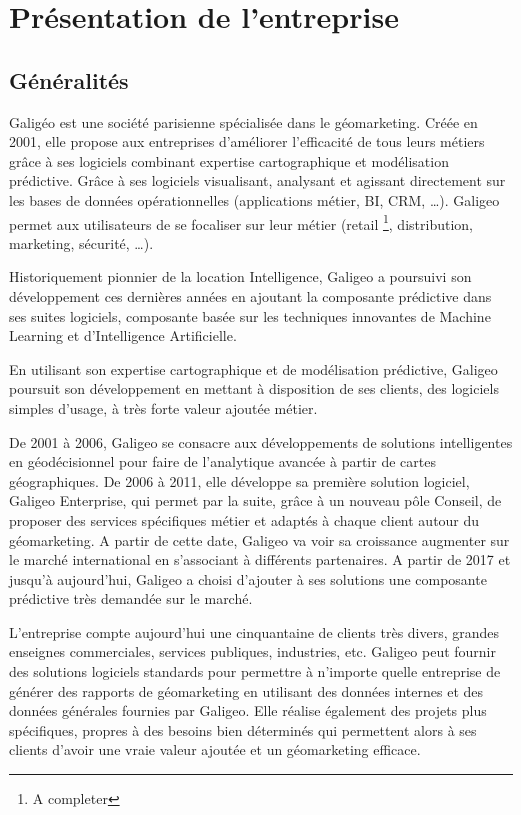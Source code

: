 
\section{Présentation de l'entreprise}

\subsection{Généralités}

Galigéo est une société parisienne spécialisée dans le géomarketing. Créée en 2001, elle propose aux entreprises d’améliorer l’efficacité de tous leurs métiers grâce à ses logiciels combinant expertise cartographique et modélisation prédictive. Grâce à ses logiciels visualisant, analysant et agissant directement sur les bases de données opérationnelles (applications métier, BI, CRM, …). Galigeo permet aux utilisateurs de se focaliser sur leur métier (retail \footnote{A completer}, distribution, marketing, sécurité, …).

Historiquement pionnier de la location Intelligence, Galigeo a poursuivi son développement ces dernières années en ajoutant la composante prédictive dans ses suites logiciels, composante basée sur les techniques innovantes de Machine Learning et d’Intelligence Artificielle.

En utilisant son expertise cartographique et de modélisation prédictive, Galigeo poursuit son développement en mettant à disposition de ses clients, des logiciels simples d’usage, à très forte valeur ajoutée métier.

De 2001 à 2006, Galigeo se consacre aux développements de solutions intelligentes en géodécisionnel pour faire de l'analytique avancée à partir de cartes géographiques. De 2006 à 2011, elle développe sa première solution logiciel, Galigeo Enterprise, qui permet par la suite, grâce à un nouveau pôle Conseil, de proposer des services spécifiques métier et adaptés à chaque client autour du géomarketing. A partir de cette date, Galigeo va voir sa croissance augmenter sur le marché international en s'associant à différents partenaires. A partir de 2017 et jusqu'à aujourd'hui, Galigeo a choisi d'ajouter à ses solutions une composante prédictive très demandée sur le marché.

L'entreprise compte aujourd'hui une cinquantaine de clients très divers, grandes enseignes commerciales, services publiques, industries, etc. Galigeo peut fournir des solutions logiciels standards pour permettre à n’importe quelle entreprise de générer des rapports de géomarketing en utilisant des données internes et des données générales fournies par Galigeo. Elle réalise également des projets plus spécifiques, propres à des besoins bien déterminés qui permettent alors à ses clients d’avoir une vraie valeur ajoutée et un géomarketing efficace.

